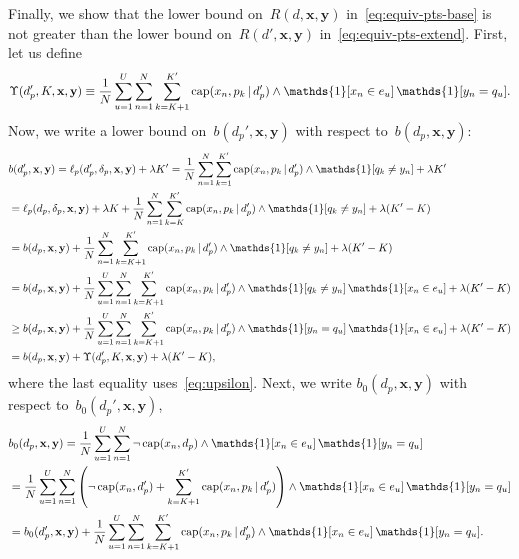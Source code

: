 \documentclass[twoside,11pt]{article}
\def\one{\mathds{1}}
\newcommand{\x}{\mathbf{x}}
\newcommand{\y}{\mathbf{y}}
\def\RL{{d}}
\def\Prefix{d_p}
\def\Labels{\delta_p}
\def\Obj{R}
\def\Loss{\ell}
\def\Reg{{\lambda}}
\def\Cap{\textnormal{cap}}
\def\one{\mathds{1}}
\newcommand{\nn}{\nonumber}
\newcommand{\given}{\,|\,}
\begin{document}
Finally, we show that the lower bound
on~${\Obj(\RL, \x, \y)}$ in~\eqref{eq:equiv-pts-base} is not greater than
the lower bound on~${\Obj(\RL', \x, \y)}$ in~\eqref{eq:equiv-pts-extend}.
%
First, let us define
\begin{align}
\Upsilon(\Prefix', K, \x, \y) \equiv \frac{1}{N} \sum_{u=1}^U \sum_{n=1}^N
    \sum_{k=K+1}^{K'} \Cap(x_n, p_k \given \Prefix') \wedge \one [ x_n \in e_u ]\, \one [ y_n = q_u ].
\label{eq:upsilon}
\end{align}
Now, we write a lower bound on~${b(\Prefix', \x, \y)}$ with respect to~${b(\Prefix, \x, \y)}$:
\begin{align}
&b(\Prefix', \x, \y) = \Loss_p(\Prefix', \Labels, \x, \y) + \Reg K'
= \frac{1}{N} \sum_{n=1}^N \sum_{k=1}^{K'} \Cap(x_n, p_k \given \Prefix') \wedge \one [ q_k \neq y_n ] + \Reg K' \nn \\
&= \Loss_p(\Prefix, \Labels, \x, \y) + \Reg K + \frac{1}{N} \sum_{n=1}^N \sum_{k=K}^{K'} \Cap(x_n, p_k \given \Prefix') \wedge \one [ q_k \neq y_n ] + \Reg (K' - K) \nn \\
&= b(\Prefix, \x, \y) + \frac{1}{N} \sum_{n=1}^N \sum_{k=K+1}^{K'} \Cap(x_n, p_k \given \Prefix') \wedge \one [ q_k \neq y_n ] + \Reg (K' - K) \nn \\
&= b(\Prefix, \x, \y) + \frac{1}{N} \sum_{u=1}^U \sum_{n=1}^N \sum_{k=K+1}^{K'} \Cap(x_n, p_k \given \Prefix')
  \wedge \one [ q_k \neq y_n ]\, \one [ x_n \in e_u ] + \Reg (K' - K) \nn \\
&\ge b(\Prefix, \x, \y) + \frac{1}{N} \sum_{u=1}^U \sum_{n=1}^N \sum_{k=K+1}^{K'} \Cap(x_n, p_k \given \Prefix')
  \wedge \one [ y_n = q_u ]\, \one [ x_n \in e_u ] + \Reg (K' - K) \nn \\
&= b(\Prefix, \x, \y) + \Upsilon(\Prefix', K, \x, \y) + \Reg (K' - K),
\label{eq:equiv-pts-b}
\end{align}
where the last equality uses~\eqref{eq:upsilon}.
%
Next, we write ${b_0(\Prefix, \x, \y)}$ with respect to~${b_0(\Prefix', \x, \y)}$,
\begin{align}
&b_0(\Prefix, \x, \y) = \frac{1}{N} \sum_{u=1}^U \sum_{n=1}^N
    \neg\, \Cap(x_n, \Prefix) \wedge \one [ x_n \in e_u ]\, \one [ y_n = q_u ] \nn \\
&= \frac{1}{N} \sum_{u=1}^U \sum_{n=1}^N
    \left(\neg\, \Cap(x_n, \Prefix')+ \sum_{k=K+1}^{K'} \Cap(x_n, p_k \given \Prefix') \right)
    \wedge \one [ x_n \in e_u ]\, \one [ y_n = q_u ] \nn \\
&= b_0(\Prefix', \x, \y) + \frac{1}{N} \sum_{u=1}^U \sum_{n=1}^N
    \sum_{k=K+1}^{K'} \Cap(x_n, p_k \given \Prefix') \wedge \one [ x_n \in e_u ]\, \one [ y_n = q_u ].
\label{eq:b0}
\end{align}
\end{document}
